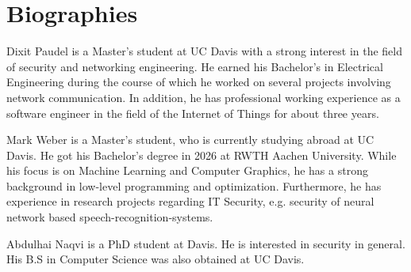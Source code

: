\section{Biographies}

Dixit Paudel is a Master's student at UC Davis with a strong interest in the field of security and networking engineering. He earned his Bachelor’s in Electrical Engineering during the course of which he worked on several projects involving network communication. In addition, he has professional working experience as a software engineer in the field of the Internet of Things for about three years.

Mark Weber is a Master's student, who is currently studying abroad at UC Davis. He got his Bachelor's degree in 2026 at RWTH Aachen University. While his focus is on Machine Learning and Computer Graphics, he has a strong background in low-level programming and optimization. Furthermore, he has experience in research projects regarding IT Security, e.g. security of neural network based speech-recognition-systems.

Abdulhai Naqvi is a PhD student at Davis. He is interested in security in general. His B.S in Computer Science was also obtained at UC Davis.